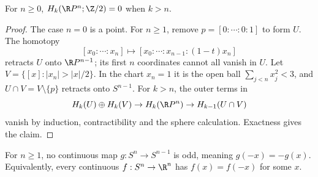 \begin{lemma}\label{lem:rpn}
For $n\ge0$, $H_k(\R P^n;\Z/2)=0$ when $k>n$.
\end{lemma}

\begin{proof}
The case $n=0$ is a point. For $n\ge1$, remove $p=[0:\cdots:0:1]$ to form $U$. The homotopy
\[
[x_0:\cdots:x_n]\longmapsto[x_0:\cdots:x_{n-1}:(1-t)x_n]
\]
retracts $U$ onto $\R P^{n-1}$; its first $n$ coordinates cannot all vanish in $U$. Let $V=\{[x]:|x_n|>|x|/2\}$. In the chart $x_n=1$ it is the open ball $\sum_{j<n}x_j^2<3$, and $U\cap V=V\setminus\{p\}$ retracts onto $S^{n-1}$. For $k>n$, the outer terms in
\[
H_k(U)\oplus H_k(V)\to H_k(\R P^n)\to H_{k-1}(U\cap V)
\]
vanish by induction, contractibility and the sphere calculation. Exactness gives the claim.
\end{proof}

\begin{theorem}\label{thm:borsukulam}
For $n\ge1$, no continuous map $g:S^n\to S^{n-1}$ is odd, meaning $g(-x)=-g(x)$. Equivalently, every continuous $f:S^n\to\R^n$ has $f(x)=f(-x)$ for some $x$.
\end{theorem}

